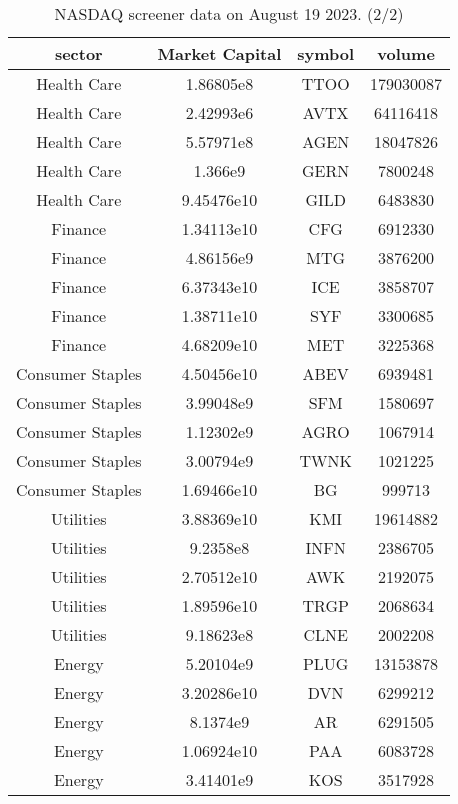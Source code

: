 \begin{table}[ht!]
    \centering
    \begin{tabular}{|c|c|c|c|} \hline
    sector                 &   Market Capital  &   symbol &   volume \\\hline
 Health Care            &   1.86805e8  &   TTOO   &   179030087\\
 Health Care            &   2.42993e6  &   AVTX   &    64116418\\
 Health Care            &   5.57971e8  &   AGEN   &    18047826\\
 Health Care            &   1.366e9    &   GERN   &     7800248\\
 Health Care            &   9.45476e10 &   GILD   &     6483830\\
 Finance                &   1.34113e10 &   CFG    &     6912330\\
 Finance                &   4.86156e9  &   MTG    &     3876200\\
 Finance                &   6.37343e10 &   ICE    &     3858707\\
 Finance                &   1.38711e10 &   SYF    &     3300685\\
 Finance                &   4.68209e10 &   MET    &     3225368\\
 Consumer Staples       &   4.50456e10 &   ABEV   &     6939481\\
 Consumer Staples       &   3.99048e9  &   SFM    &     1580697\\
 Consumer Staples       &   1.12302e9  &   AGRO   &     1067914\\
 Consumer Staples       &   3.00794e9  &   TWNK   &     1021225\\
 Consumer Staples       &   1.69466e10 &   BG     &      999713\\
 Utilities              &   3.88369e10 &   KMI    &    19614882\\
 Utilities              &   9.2358e8   &   INFN   &     2386705\\
 Utilities              &   2.70512e10 &   AWK    &     2192075\\
 Utilities              &   1.89596e10 &   TRGP   &     2068634\\
 Utilities              &   9.18623e8  &   CLNE   &     2002208\\
 Energy                 &   5.20104e9  &   PLUG   &    13153878\\
 Energy                 &   3.20286e10 &   DVN    &     6299212\\
 Energy                 &   8.1374e9   &   AR     &     6291505\\
 Energy                 &   1.06924e10 &   PAA    &     6083728\\
 Energy                 &   3.41401e9  &   KOS    &     3517928\\
 \hline
    \end{tabular}
  \caption{NASDAQ screener data on August 19 2023. (2/2)}
    \label{tab:NASDAQ_2}
\end{table}



